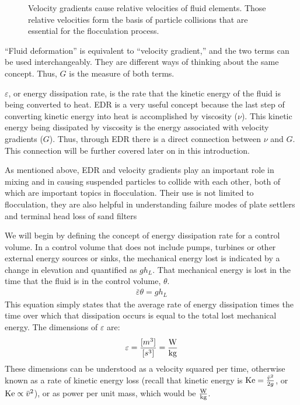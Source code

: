 \documentclass[letterpaper,10pt,english]{sphinxmanual}
\let\sphinxpxdimen\pdfpxdimen\else\newdimen\sphinxpxdimen
\begin{document}
\begin{figure}[htbp]
\centering
\capstart

\noindent\sphinxincludegraphics[width=700\sphinxpxdimen]{{Velocity_gradient_image}.jpg}
\caption{Velocity gradients cause relative velocities of fluid elements. Those relative velocities form the basis of particle collisions that are essential for the flocculation process.}\label{\detokenize{Rapid_Mix/RM_Intro:id13}}\label{\detokenize{Rapid_Mix/RM_Intro:figure-velocity-gradient-image}}\end{figure}

 “Fluid deformation” is equivalent to “velocity gradient,” and the two terms can be used interchangeably. They are different ways of thinking about the same concept. Thus, \(G\) is the measure of both terms.

\(\varepsilon\), or energy dissipation rate, is the rate that the kinetic energy of the fluid is being converted to heat. EDR is a very useful concept because the last step of converting kinetic energy into heat is accomplished by viscosity (\(\nu\)). This kinetic energy being dissipated by viscosity is the energy associated with velocity gradients (\(G\)). Thus, through EDR there is a direct connection between \(\nu\) and \(G\). This connection will be further covered later on in this introduction.

As mentioned above, EDR and velocity gradients play an important role in mixing and in causing suspended particles to collide with each other, both of which are important topics in flocculation. Their use is not limited to flocculation, they are also helpful in understanding failure modes of plate settlers and terminal head loss of sand filters

We will begin by defining the concept of energy dissipation rate for a control volume. In a control volume that does not include pumps, turbines or other external energy sources or sinks, the mechanical energy lost is indicated by a change in elevation and quantified as \(g h_L\). That mechanical energy is lost in the time that the fluid is in the control volume, \(\theta\).
\begin{equation}\label{equation:Rapid_Mix/RM_Intro:Rapid_Mix/RM_Intro:11}
\begin{split}\bar\varepsilon \theta = g h_L\end{split}
\end{equation}
This equation simply states that the average rate of energy dissipation times the time over which that dissipation occurs is equal to the total lost mechanical energy. The dimensions of \(\varepsilon\) are:
\begin{equation}\label{equation:Rapid_Mix/RM_Intro:Rapid_Mix/RM_Intro:12}
\begin{split}\varepsilon = \frac{[m^3]}{[s^3]} = {\rm \frac{W}{kg}}\end{split}
\end{equation}
These dimensions can be understood as a velocity squared per time, otherwise known as a rate of kinetic energy loss (recall that kinetic energy is \({\rm Ke} = \frac{\bar v^2}{2g}\), or \({\rm Ke} \propto \bar v^2\)), or as power per unit mass, which would be \({\rm  \frac{W}{kg}}\).
\end{document}
